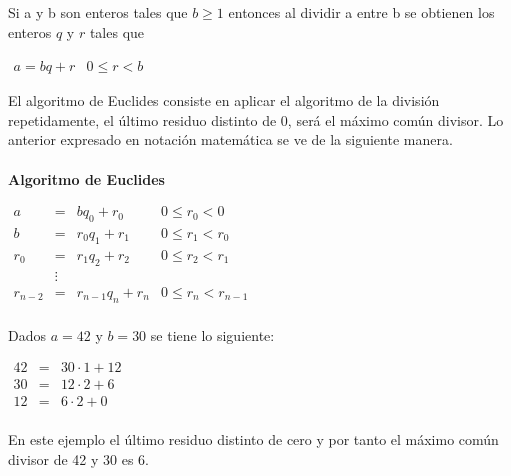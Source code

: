\begin{definition} 
  Si a y b son enteros tales que $b \geq 1$ entonces al dividir a entre b
 se obtienen  los enteros $q$ y $r$ tales que 
\begin{center}
$\begin{array}{ll}
   a=bq+r & 0 \leq r < b
 \end{array}$
\end{center} 
\end{definition}
El algoritmo de Euclides consiste en aplicar 
el algoritmo de la divisi\'on repetidamente, el \'ultimo residuo 
distinto de 0, ser\'a el m\'aximo com\'un divisor. Lo anterior 
expresado en notaci\'on matem\'atica se ve de la siguiente 
manera. 
\\ \\
{\bf Algoritmo de Euclides} 
\begin{center}
$\begin{array}{lcll}
 a&=&bq_0+r_0& 0 \leq r_0 <0 \\
 b&=&r_0q_1+r_1& 0 \leq r_1 <r_0 \\
 r_0&=&r_1q_2+r_2& 0 \leq r_2 <r_1 \\
    & \vdots & & \\
 r_{n-2}&=&r_{n-1}q_n+r_n& 0 \leq r_n <r_{n-1} \\
\end{array}$
\end{center}
\begin{example}
Dados $a=42$ y $b=30$ se tiene lo siguiente:
\begin{center}
$\begin{array}{lcl}
   42 & = & 30 \cdot 1 + 12 \\
   30 & = & 12 \cdot 2 + 6 \\
   12 & = & 6 \cdot 2 + 0 \\
 \end{array}$
\end{center}
En este ejemplo el \'ultimo residuo distinto de cero y por tanto el 
m\'aximo com\'un divisor de 42 y 30 es 6.
\end{example}

